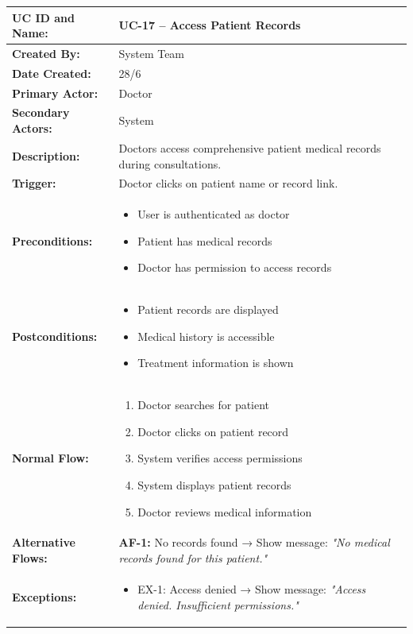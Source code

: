 \documentclass[12pt,a4paper]{article}
\begin{document}
\renewcommand{\arraystretch}{1.5}
\begin{longtable}{|p{4.5cm}|p{10.5cm}|}
\hline
\textbf{UC ID and Name:} & UC-17 – Access Patient Records \\
\hline
\textbf{Created By:} & System Team \\
\hline
\textbf{Date Created:} & 28/6 \\
\hline
\textbf{Primary Actor:} & Doctor \\
\hline
\textbf{Secondary Actors:} & System \\
\hline
\textbf{Description:} & Doctors access comprehensive patient medical records during consultations. \\
\hline
\textbf{Trigger:} & Doctor clicks on patient name or record link. \\
\hline
\textbf{Preconditions:} &
\begin{itemize}
  \item User is authenticated as doctor
  \item Patient has medical records
  \item Doctor has permission to access records
\end{itemize} \\
\hline
\textbf{Postconditions:} &
\begin{itemize}
  \item Patient records are displayed
  \item Medical history is accessible
  \item Treatment information is shown
\end{itemize} \\
\hline
\textbf{Normal Flow:} &
\begin{enumerate}
  \item Doctor searches for patient
  \item Doctor clicks on patient record
  \item System verifies access permissions
  \item System displays patient records
  \item Doctor reviews medical information
\end{enumerate} \\
\hline
\textbf{Alternative Flows:} &
\textbf{AF-1:} No records found → Show message: \textit{"No medical records found for this patient."} \\
\hline
\textbf{Exceptions:} &
\begin{itemize}
  \item EX-1: Access denied → Show message: \textit{"Access denied. Insufficient permissions."}

\end{itemize}
\end{longtable}
\end{document}
